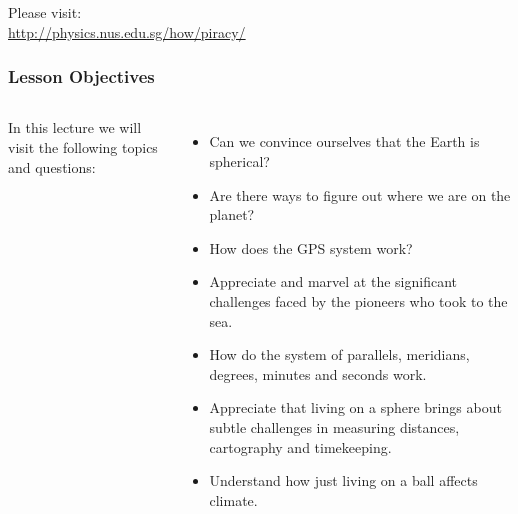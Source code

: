{
\begin{frame}
\maketitle

\begin{center}
	\small Please visit:\\
	\url{http://physics.nus.edu.sg/how/piracy/}
\end{center}
\end{frame}	
}
\begin{frame}
\frametitle{Lesson Objectives}
\begin{columns}
	In this lecture we will visit the following topics and questions:
	\begin{itemize}
		\item Can we convince ourselves that the Earth is spherical?
		\item Are there ways to figure out where we are on the planet?
		\item How does the GPS system work?
		\item Appreciate and marvel at the significant challenges faced by the pioneers who took to the sea.
		\item How do the system of parallels, meridians, degrees, minutes and seconds work.
		\item Appreciate that living on a sphere brings about subtle challenges in measuring distances, cartography and timekeeping.
		\item Understand how just living on a ball affects climate.
	\end{itemize}
\end{columns}
\end{frame}	

